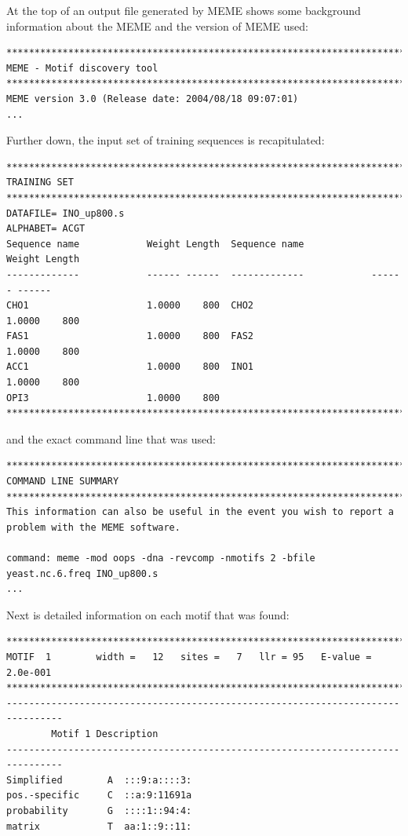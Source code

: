 \documentclass{report}
\begin{document}
At the top of an output file generated by MEME shows some background information
about the MEME and the version of MEME used:
\begin{verbatim}
********************************************************************************
MEME - Motif discovery tool
********************************************************************************
MEME version 3.0 (Release date: 2004/08/18 09:07:01)
...
\end{verbatim}
Further down, the input set of training sequences is recapitulated:
\begin{verbatim}
********************************************************************************
TRAINING SET
********************************************************************************
DATAFILE= INO_up800.s
ALPHABET= ACGT
Sequence name            Weight Length  Sequence name            Weight Length
-------------            ------ ------  -------------            ------ ------
CHO1                     1.0000    800  CHO2                     1.0000    800
FAS1                     1.0000    800  FAS2                     1.0000    800
ACC1                     1.0000    800  INO1                     1.0000    800
OPI3                     1.0000    800
********************************************************************************
\end{verbatim}
and the exact command line that was used:
\begin{verbatim}
********************************************************************************
COMMAND LINE SUMMARY
********************************************************************************
This information can also be useful in the event you wish to report a
problem with the MEME software.

command: meme -mod oops -dna -revcomp -nmotifs 2 -bfile yeast.nc.6.freq INO_up800.s
...
\end{verbatim}
Next is detailed information on each motif that was found:
\begin{verbatim}
********************************************************************************
MOTIF  1        width =   12   sites =   7   llr = 95   E-value = 2.0e-001
********************************************************************************
--------------------------------------------------------------------------------
        Motif 1 Description
--------------------------------------------------------------------------------
Simplified        A  :::9:a::::3:
pos.-specific     C  ::a:9:11691a
probability       G  ::::1::94:4:
matrix            T  aa:1::9::11:
\end{verbatim}
\end{document}
